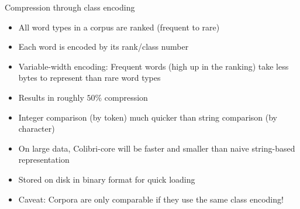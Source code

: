 \documentclass[compress]{beamer}
\begin{document}
\begin{frame}

  \begin{block}{Compression through class encoding}
    \begin{itemize}
      \item All word types in a corpus are ranked (frequent to rare)
      \item Each word is encoded by its rank/class number
      \item Variable-width encoding: Frequent words (high up in the ranking)
        take less bytes to represent than rare word types
      \item Results in roughly $50\%$ compression
      \item Integer comparison (by token) much quicker than string comparison
        (by character)
      \item On large data, Colibri-core will be faster and smaller than naive string-based representation
      \item Stored on disk in binary format for quick loading
      \item Caveat: Corpora are only comparable if they use the same class
        encoding!
    \end{itemize}
  \end{block}

\end{frame}
\end{document}
